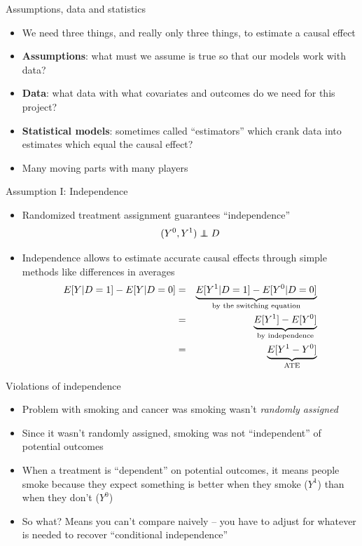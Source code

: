 \documentclass{beamer}
\newcommand\independent{\protect\mathpalette{\protect\independenT}{\perp}}
\def\independenT#1#2{\mathrel{\rlap{$#1#2$}\mkern2mu{#1#2}}}
\begin{document}
\begin{frame}{Assumptions, data and statistics}

\begin{itemize}
\item We need three things, and really only three things, to estimate a causal effect
\item \textbf{Assumptions}: what must we assume is true so that our models work with data?
\item \textbf{Data}: what data with what covariates and outcomes do we need for this project?
\item \textbf{Statistical models}: sometimes called ``estimators'' which crank data into estimates which equal the causal effect?
\item Many moving parts with many players 
\end{itemize}

\end{frame}

\begin{frame}{Assumption I: Independence}
	
	\begin{itemize}
	\item Randomized treatment assignment guarantees ``independence'' $$(Y^0,Y^1)\independent{D}$$
	\item Independence allows to estimate accurate causal effects through simple methods like differences in averages
		\begin{eqnarray*}
		E[Y|D=1] - E[Y|D=0] &=& \underbrace{E[Y^1|D=1] - E[Y^0|D=0]}_{\mathclap{\text{by the switching equation}}} \\
		&=& \underbrace{E[Y^1] - E[Y^0]}_{\mathclap{\text{by independence}}} \\
		&=& \underbrace{E[Y^1-Y^0]}_{\mathclap{\text{ATE}}}
		\end{eqnarray*}
	\end{itemize}
\end{frame}

\begin{frame}{Violations of independence}

\begin{itemize}
\item Problem with smoking and cancer was smoking wasn't \emph{randomly assigned}
\item Since it wasn't randomly assigned, smoking was not ``independent'' of potential outcomes
\item When a treatment is ``dependent'' on potential outcomes, it means people smoke because they expect something is better when they smoke ($Y^1$) than when they don't ($Y^0$)
\item So what?  Means you can't compare naively -- you have to adjust for whatever is needed to recover ``conditional independence''
\end{itemize}

\end{frame}
\end{document}
